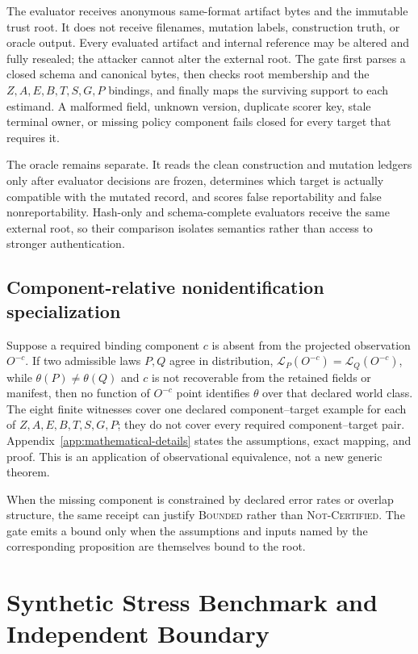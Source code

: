 \documentclass{article}
\newcommand{\bounded}{\textsc{Bounded}\xspace}
\newcommand{\notcert}{\textsc{Not-Certified}\xspace}
\begin{document}
The evaluator receives anonymous same-format artifact bytes and the immutable trust root. It does not receive filenames, mutation labels, construction truth, or oracle output. Every evaluated artifact and internal reference may be altered and fully resealed; the attacker cannot alter the external root. The gate first parses a closed schema and canonical bytes, then checks root membership and the $Z,A,E,B,T,S,G,P$ bindings, and finally maps the surviving support to each estimand. A malformed field, unknown version, duplicate scorer key, stale terminal owner, or missing policy component fails closed for every target that requires it.

The oracle remains separate. It reads the clean construction and mutation ledgers only after evaluator decisions are frozen, determines which target is actually compatible with the mutated record, and scores false reportability and false nonreportability. Hash-only and schema-complete evaluators receive the same external root, so their comparison isolates semantics rather than access to stronger authentication.

\subsection{Component-relative nonidentification specialization}

Suppose a required binding component $c$ is absent from the projected observation $O^{-c}$. If two admissible laws $P,Q$ agree in distribution, $\mathcal L_P(O^{-c})=\mathcal L_Q(O^{-c})$, while $\theta(P)\ne\theta(Q)$ and $c$ is not recoverable from the retained fields or manifest, then no function of $O^{-c}$ point identifies $\theta$ over that declared world class. The eight finite witnesses cover one declared component--target example for each of $Z,A,E,B,T,S,G,P$; they do not cover every required component--target pair. Appendix~\ref{app:mathematical-details} states the assumptions, exact mapping, and proof. This is an application of observational equivalence, not a new generic theorem.

When the missing component is constrained by declared error rates or overlap structure, the same receipt can justify \bounded rather than \notcert. The gate emits a bound only when the assumptions and inputs named by the corresponding proposition are themselves bound to the root.

\section{Synthetic Stress Benchmark and Independent Boundary}
\label{sec:benchmark}
\end{document}
